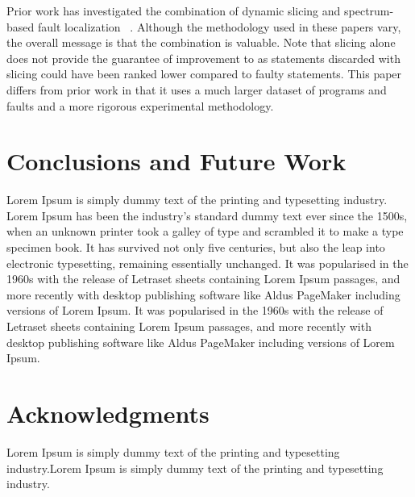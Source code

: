 \documentclass{article}
\begin{document}
Prior work has investigated the combination of dynamic slicing and
spectrum-based fault
localization ~\cite{Wotawa:2010:FLB:1848650.1849235,Alves:2011:FUD:2190078.2190115,DBLP:conf/ecai/HoferW12,lei-mao-dai-wang-2012,slicing-sfl-repair}. Although
the methodology used in these papers vary, the overall message is that
the combination is valuable. Note that slicing alone does not provide
the guarantee of improvement to \sfl{} as statements discarded with
slicing could have been ranked lower compared to faulty
statements. This paper differs from prior work in that it uses a much
larger dataset of programs and faults and a more rigorous experimental
methodology.


\section{Conclusions and Future Work}\label{sec:conc}

 Lorem Ipsum is simply dummy text of the printing and typesetting industry. Lorem Ipsum has been the industry's standard dummy text ever since the 1500s, when an unknown printer took a galley of type and scrambled it to make a type specimen book. It has survived not only five centuries, but also the leap into electronic typesetting, remaining essentially unchanged. It was popularised in the 1960s with the release of Letraset sheets containing Lorem Ipsum passages, and more recently with desktop publishing software like Aldus PageMaker including versions of Lorem Ipsum. It was popularised in the 1960s with the release of Letraset sheets containing Lorem Ipsum passages, and more recently with desktop publishing software like Aldus PageMaker including versions of Lorem Ipsum.


\section*{Acknowledgments}

 Lorem Ipsum is simply dummy text of the printing and typesetting industry.Lorem Ipsum is simply dummy text of the printing and typesetting industry.

{
  \small
  \balance
  
  
}
\end{document}
